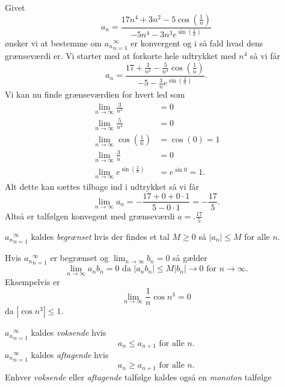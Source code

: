 \begin{eks} 
  Givet 
  \[ 
  a_n = \frac{17n^{4} + 3n^2 - 5 \cos \left( \frac{1}{n} \right)}{-5n^{4} - 3n^3 e^{\sin \left( \frac{2}{n} \right)}}
  \]
  ønsker vi at bestemme om ${a_n}_{n = 1}^{\infty}$ er konvergent og i så fald hvad dens grænseværdi er.
  \bigbreak
  Vi starter med at forkorte hele udtrykket med $n^{4}$ så vi får
  \[ 
  a_n = \frac{17 + \frac{3}{n^2} - \frac{5}{n^{4}} \cos \left( \frac{1}{n} \right)}{-5 - \frac{3}{n} e^{\sin \left( \frac{2}{n} \right)}}
  .\]
  Vi kan nu finde grænseværdien for hvert led som
  \begin{align*}
    \lim_{n \to \infty} \frac{3}{n^2} &= 0 \\
    \lim_{n \to \infty} \frac{5}{n^{4}} &= 0 \\
    \lim_{n \to \infty} \cos \left( \frac{1}{n} \right) &= \cos(0) = 1 \\
    \lim_{n \to \infty} \frac{3}{n} &= 0 \\
    \lim_{n \to \infty} e^{\sin \left( \frac{2}{n} \right)} &= e^{\sin 0} = 1
  .\end{align*}
  Alt dette kan sættes tilbage ind i udtrykket så vi får
  \[ 
  \lim_{n \to \infty} a_n = - \frac{17 + 0 + 0 \cdot 1}{5 - 0 \cdot 1} = -\frac{17}{5}
  .\]
  Altså er talfølgen konvegent med grænseværdi $a = .\frac{17}{5}$
\end{eks}

\begin{definition} 
  ${a_n}_{n = 1}^{\infty}$ kaldes \textit{begrænset} hvis der findes et tal $M \geq 0$ så $|a_n| \leq M$ for alle $n$.
\end{definition}

\begin{sæt}
  Hvis ${a_n}_{n = 1}^{\infty}$ er begrænset og $\lim_{n \to \infty} b_n = 0 $ så gælder
  \[ 
  \lim_{n \to \infty} a_nb_n = 0 \text{ da } |a_nb_n| \leq M|b_n| \to 0 \text{ for } n \to \infty
  .\]
  Eksempelvis er
  \[ 
  \lim_{n \to \infty} \frac{1}{n} \cos n^3 = 0
  \]
  da $|\cos n^3| \leq 1$.
\end{sæt}

\begin{definition} 
  ${a_n}_{n = 1}^{\infty}$ kaldes \textit{voksende} hvis
  \[ 
  a_n \leq a_{n+1} \text{ for alle } n
  .\]
  ${a_n}_{n = 1}^{\infty}$ kaldes \textit{aftagende} hvis
  \[ 
  a_n \geq a_{n+1} \text{ for alle } n
  .\]
  Enhver \textit{voksende} eller \textit{aftagende} talfølge kaldes også en \textit{monoton} talfølge
\end{definition}


